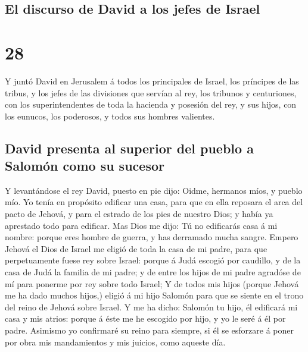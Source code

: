 \hypertarget{el-discurso-de-david-a-los-jefes-de-israel}{%
\subsection{El discurso de David a los jefes de
Israel}\label{el-discurso-de-david-a-los-jefes-de-israel}}

\hypertarget{section-27}{%
\section{28}\label{section-27}}

 Y juntó David en Jerusalem á todos los principales de
Israel, los príncipes de las tribus, y los jefes de las divisiones que
servían al rey, los tribunos y centuriones, con los superintendentes de
toda la hacienda y posesión del rey, y sus hijos, con los eunucos, los
poderosos, y todos sus hombres valientes.

\hypertarget{david-presenta-al-superior-del-pueblo-a-salomuxf3n-como-su-sucesor}{%
\subsection{David presenta al superior del pueblo a Salomón como su
sucesor}\label{david-presenta-al-superior-del-pueblo-a-salomuxf3n-como-su-sucesor}}

 Y levantándose el rey David, puesto en pie dijo: Oidme,
hermanos míos, y pueblo mío. Yo tenía en propósito edificar una casa,
para que en ella reposara el arca del pacto de Jehová, y para el estrado
de los pies de nuestro Dios; y había ya aprestado todo para edificar.
 Mas Dios me dijo: Tú no edificarás casa á mi nombre: porque
eres hombre de guerra, y has derramado mucha sangre.  Empero
Jehová el Dios de Israel me eligió de toda la casa de mi padre, para que
perpetuamente fuese rey sobre Israel: porque á Judá escogió por
caudillo, y de la casa de Judá la familia de mi padre; y de entre los
hijos de mi padre agradóse de mí para ponerme por rey sobre todo Israel;
 Y de todos mis hijos (porque Jehová me ha dado muchos
hijos,) eligió á mi hijo Salomón para que se siente en el trono del
reino de Jehová sobre Israel.  Y me ha dicho: Salomón tu
hijo, él edificará mi casa y mis atrios: porque á éste me he escogido
por hijo, y yo le seré á él por padre.  Asimismo yo
confirmaré su reino para siempre, si él se esforzare á poner por obra
mis mandamientos y mis juicios, como aqueste día.

